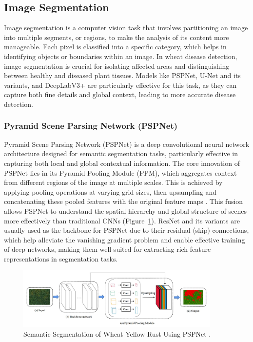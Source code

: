 \subsection{Image Segmentation}
Image segmentation is a computer vision task that involves partitioning an image into multiple segments, or regions, to make the analysis of its content more manageable. Each pixel is classified into a specific category, which helps in identifying objects or boundaries within an image. In wheat disease detection, image segmentation is crucial for isolating affected areas and distinguishing between healthy and diseased plant tissues. Models like PSPNet, U-Net and its variants, and DeepLabV3+ are particularly effective for this task, as they can capture both fine details and global context, leading to more accurate disease detection.

\subsubsection{Pyramid Scene Parsing Network (PSPNet)}
Pyramid Scene Parsing Network (PSPNet) is a deep convolutional neural network architecture designed for semantic segmentation tasks, particularly effective in capturing both local and global contextual information. The core innovation of PSPNet lies in its Pyramid Pooling Module (PPM), which aggregates context from different regions of the image at multiple scales. This is achieved by applying pooling operations at varying grid sizes, then upsampling and concatenating these pooled features with the original feature maps \parencite{pan2021deep}. This fusion allows PSPNet to understand the spatial hierarchy and global structure of scenes more effectively than traditional CNNs (Figure~\ref{fig:PSPNet}). ResNet and its variants are usually used as the backbone for PSPNet due to their residual (skip) connections, which help alleviate the vanishing gradient problem and enable effective training of deep networks, making them well-suited for extracting rich feature representations in segmentation tasks.
\begin{figure}[H] %
    \centering
    \includegraphics[width=0.9\textwidth]{chapters/chapter1/images/Figure20.png}
    \caption{Semantic Segmentation of Wheat Yellow Rust Using PSPNet \parencite{pan2021deep}.}
    \label{fig:PSPNet}
\end{figure}

